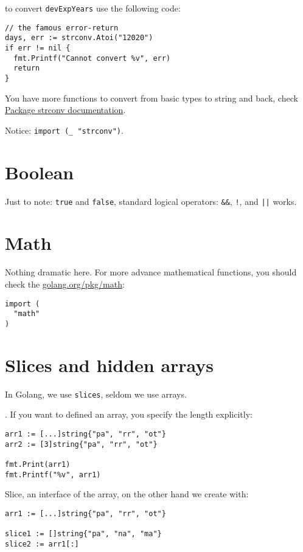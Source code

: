 \documentclass[11pt, letterpaper]{article}
\begin{document}
to convert \texttt{devExpYears} use the following code:

\begin{verbatim}
// the famous error-return
days, err := strconv.Atoi("12020")
if err != nil {
  fmt.Printf("Cannot convert %v", err)
  return
}
\end{verbatim}

You have more functions to convert from basic types to string and back, check \href{https://golang.org/pkg/strconv}{Package strconv documentation}.

Notice: \texttt{import (_ "strconv")}.

\section{Boolean}

Just to note: \texttt{true} and \texttt{false}, standard logical operators: \texttt{&&}, \texttt{!}, and \texttt{||} works.

\section{Math}
Nothing dramatic here. For more advance mathematical functions, you should check the \href{https://golang.org/pkg/math}{golang.org/pkg/math}:
\begin{verbatim}
import (
  "math"
)
\end{verbatim}

\section{Slices and hidden arrays}
In Golang, we use \texttt{slices}, seldom we use arrays.

. If you want to defined an array, you specify the length explicitly:

\begin{verbatim}
arr1 := [...]string{"pa", "rr", "ot"}
arr2 := [3]string{"pa", "rr", "ot"}

fmt.Print(arr1)
fmt.Printf("%v", arr1)
\end{verbatim}

Slice, an interface of the array, on the other hand we create with:

\begin{verbatim}
arr1 := [...]string{"pa", "rr", "ot"}

slice1 := []string{"pa", "na", "ma"}
slice2 := arr1[:]
\end{verbatim}
\end{document}
